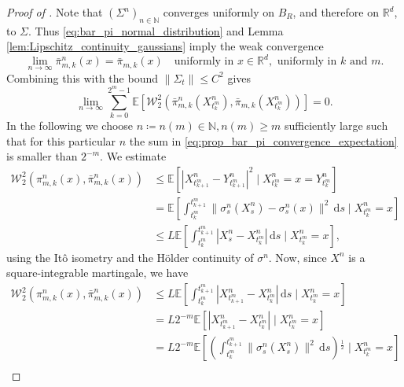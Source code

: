 \documentclass[12pt,oneside]{amsart}
\theoremstyle{definition}
\newcommand{\D}{\mathrm{d}}
\newcommand{\N}{\mathbb N}
\newcommand{\R}{\mathbb R}
\def\R{{\mathbb R}}
\numberwithin{equation}{section}
\begin{document}
\begin{proof}[Proof of ]
Note that $(\Sigma^n)_{n \in \N}$ converges uniformly on $B_R$, and therefore on $\R^d$, to $\Sigma$. Thus \eqref{eq:bar_pi_normal_distribution} and Lemma \ref{lem:Lipschitz_continuity_gaussians} imply the weak convergence
\begin{equation}
    \label{eq:bar_pi_convergence}
    \lim_{n \to \infty}\bar \pi^n_{m,k}(x) = \bar \pi_{m,k}(x)\quad \text{uniformly in }x \in \R^d, \mbox{ uniformly in }k \mbox{ and }m.
\end{equation}
Combining this with the bound $\|\Sigma_t\| \le C^2$ gives
\begin{equation}
    \label{eq:prop_bar_pi_convergence_expectation}
    \lim_{n \to \infty}
    \sum_{k = 0}^{2^m - 1} \mathbb E \!\left[ \mathcal W_2^2\!\left(\bar \pi^n_{m,k}(X^n_{t^m_k}), \bar \pi_{m,k}(X^n_{t^m_k})\right)\! \right]\! = 0.
\end{equation}
In the following we choose $n \coloneqq n(m) \in \N, n(m) \ge m$ sufficiently large such that for this particular $n$ the sum in \eqref{eq:prop_bar_pi_convergence_expectation} is smaller than $2^{-m}$.
We estimate
\begin{align}
    \nonumber
    \mathcal W_2^2\!\left( \pi^n_{m,k}(x), \bar \pi^n_{m,k}(x) \right)\! 
    &\le 
    \mathbb E \!\left[ |X^n_{t^m_{k+1}} - Y^n_{t^m_{k+1}} |^2 \mid X^n_{t^m_k} = x = Y^n_{t^m_k} \right]\!
    \\
    \nonumber
    &=
    \mathbb E \!\left[ \int_{t^m_k}^{t^m_{k+1}} \|\sigma^n_s(X^n_s) - \sigma^n_s(x) \|^2 \, \D s \mid X^n_{t^m_k} = x \right]\!
    \\
    \nonumber
    &\le
    L \mathbb E \!\left[ \int_{t^m_k}^{t^m_{k+1}} | X^n_s - X^n_{t^m_k} | \, \D s \mid X^n_{t^m_k} = x \right]\!,
    \end{align}
using the It\^o isometry and the H\"older continuity of $\sigma^n$. Now, since $X^n$ is a square-integrable martingale, we have
    \begin{align}
    \mathcal W_2^2\!\left( \pi^n_{m,k}(x), \bar \pi^n_{m,k}(x) \right)\! 
    &\le
    L \mathbb E \!\left[ \int_{t^m_k}^{t^m_{k+1}} | X^n_{t^m_{k+1}} - X^n_{t^m_k} | \, \D s \mid X^n_{t^m_k} = x \right]\!
    \\
    \nonumber
    &=
    L 2^{-m} \mathbb E \!\left[ |X^n_{t^m_{k+1}} - X^n_{t^m_k}| \mid  X^n_{t^m_k} = x \right]\!
    \\
    \nonumber
    &=
    L 2^{-m} \mathbb E \!\left[  \!\left(\int_{t^m_k}^{t^m_{k+1}} \| \sigma^n_s(X^n_s) \|^2 \, \D s\right)\!^\frac12 \mid X^n_{t^m_k} = x  \right]\!
    \\

\end{align}
\end{proof}
\end{document}
